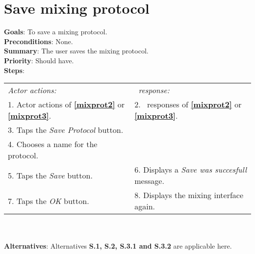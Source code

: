   \section{Save mixing protocol}
  \label{saveprot}
  \textbf{Goals}: To save a mixing protocol.\\
  \textbf{Preconditions}: None. \\
  \textbf{Summary}: The user saves the mixing protocol.\\
  \textbf{Priority}: Should have.\\
  \textbf{Steps}: \\
  \begin{tabular}{ p{} p{} }
  	\emph{Actor actions:} & \emph{\projectname\ response:} \\
  	1. Actor actions of \textbf{\ref{mixprot2}} or \textbf{\ref{mixprot3}}. & 2. \projectname\ responses of \textbf{\ref{mixprot2}} or \textbf{\ref{mixprot3}}. \\
    3. Taps the \emph{Save Protocol} button.  & \\
    4. Chooses a name for the protocol. & \\
    5. Taps the \emph{Save} button. & 6. Displays a \emph{Save was succesfull} message.\\
    7. Taps the \emph{OK} button. & 8. Displays the mixing interface again. \\
      \end{tabular}
    	 \\
    \\\textbf{Alternatives}: Alternatives \textbf{S.1, S.2, S.3.1 and S.3.2} are applicable here.

